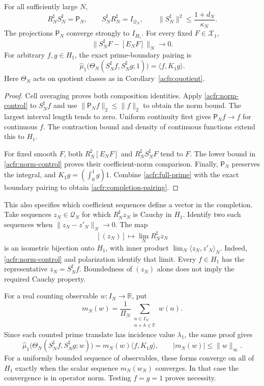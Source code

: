 \begin{corollary}\label{acfr:completion}
For all sufficiently large $N$,
\[
 R_N^\sharp S_N^\sharp=\mathsf P_N,\qquad
 S_N^\sharp R_N^\sharp=I_{\mathcal Q_N},\qquad
 \|S_N^\sharp\|^2\leq\frac{1+d_N}{\kappa_N}.
\]
The projections $\mathsf P_N$ converge strongly to $I_{H_1}$.
For every fixed $F\in\mathcal X_1$,
\[
 \|S_N^\sharp F-[E_NF]\|_N\longrightarrow0.
\]
For arbitrary $f,g\in H_1$, the exact prime-boundary pairing is
\begin{equation}\label{acfr:completion-pairing}
 \widehat\mu_1\bigl(\Theta_N(S_N^\sharp f,S_N^\sharp g;1)\bigr)
       =\langle f,K_1g\rangle.
\end{equation}
Here $\Theta_N$ acts on quotient classes as in Corollary~\ref{acfp:quotient}.
\end{corollary}

\begin{proof}
Cell averaging proves both composition identities.
Apply \eqref{acfr:norm-control} to $S_N^\sharp f$ and use
$\|\mathsf P_Nf\|_2\leq\|f\|_2$ to obtain the norm bound.
The largest interval length tends to zero.
Uniform continuity first gives $\mathsf P_Nf\to f$ for continuous $f$.
The contraction bound and density of continuous functions extend this to $H_1$.

For fixed smooth $F$, both
$R_N^\sharp[E_NF]$ and $R_N^\sharp S_N^\sharp F$ tend to $F$.
The lower bound in \eqref{acfr:norm-control} proves their coefficient-norm comparison.
Finally, $\mathsf P_N$ preserves the integral, and
$K_1g=(\int_0^1g)1$.
Combine \eqref{acfr:full-prime} with the exact boundary pairing to obtain
\eqref{acfr:completion-pairing}.
\end{proof}

This also specifies which coefficient sequences define a vector in the completion.
Take sequences $z_N\in\mathcal Q_N$ for which $R_N^\sharp z_N$ is Cauchy in $H_1$.
Identify two such sequences when $\|z_N-z'_N\|_N\to0$.
The map
\[
 [(z_N)]\longmapsto\lim_NR_N^\sharp z_N
\]
is an isometric bijection onto $H_1$, with inner product
$\lim_N\langle z_N,z'_N\rangle_N$.
Indeed, \eqref{acfr:norm-control} and polarization identify that limit.
Every $f\in H_1$ has the representative $z_N=S_N^\sharp f$.
Boundedness of $(z_N)$ alone does not imply the required Cauchy property.

For a real counting observable $w:I_N\to\mathbb R$, put
\[
 m_N(w)=\frac1{\Pi_N}\sum_{\substack{n\in I_N\\n+h\in\mathbb P}}w(n).
\]
Since each counted prime translate has incidence value $\lambda_1$, the same proof gives
\begin{equation}\label{acfr:weighted-one}
 \widehat\mu_1\bigl(\Theta_N(S_N^\sharp f,S_N^\sharp g;w)\bigr)
       =m_N(w)\langle f,K_1g\rangle,
 \qquad |m_N(w)|\leq\|w\|_\infty.
\end{equation}
For a uniformly bounded sequence of observables, these forms converge on all
of $H_1$ exactly when the scalar sequence $m_N(w_N)$ converges.
In that case the convergence is in operator norm.
Testing $f=g=1$ proves necessity.

